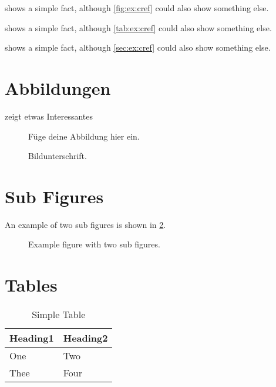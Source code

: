 \documentclass[
  numbers=autoendperiod,
  ngerman,  %
  a4paper,  %
  twoside,  %
  bibliography=totoc,
  headsepline,
  cleardoublepage=empty,
  parskip=half,
  draft=false
]{scrbook}
\theoremstyle{break}
\begin{document}
\begin{ltgexample}
 shows a simple fact, although \cref{fig:ex:cref} could also show something else.

 shows a simple fact, although \cref{tab:ex:cref} could also show something else.

 shows a simple fact, although \cref{sec:ex:cref} could also show something else.
\end{ltgexample}

\section{Abbildungen}

\begin{ltgexample}
 zeigt etwas Interessantes

\begin{figure}
  \centering
  Füge deine Abbildung hier ein.
  \caption{Bildunterschrift.}
  \label{fig:label}
\end{figure}
\end{ltgexample}

\section{Sub Figures}

An example of two sub figures is shown in \cref{fig:two_sub_figures}.

\begin{ltgexample}
\begin{figure}[!b]
  \centering
  \hfil
  \caption{Example figure with two sub figures.}
  \label{fig:two_sub_figures}
\end{figure}
\end{ltgexample}

\section{Tables}

\begin{ltgexample}
\begin{table}
  \caption{Simple Table}
  \label{tab:simple}
  \centering
  \begin{tabular}{ll}
    \toprule
    Heading1 & Heading2 \\
    \midrule
    One      & Two      \\
    Thee     & Four     \\
    \bottomrule
  \end{tabular}
\end{table}
\end{ltgexample}
\end{document}
